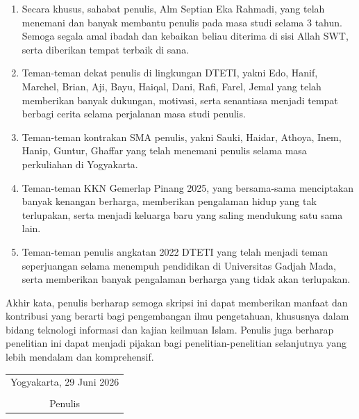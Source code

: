 \begin{enumerate}
	\item Secara khusus, sahabat penulis, Alm Septian Eka Rahmadi, yang telah menemani dan banyak membantu penulis pada masa studi selama 3 tahun. Semoga segala amal ibadah dan kebaikan beliau diterima di sisi Allah SWT, serta diberikan tempat terbaik di sana.

	\item Teman-teman dekat penulis di lingkungan DTETI, yakni Edo, Hanif, Marchel, Brian, Aji, Bayu, Haiqal, Dani, Rafi, Farel, Jemal yang telah memberikan banyak dukungan, motivasi, serta senantiasa menjadi tempat berbagi cerita selama perjalanan masa studi penulis.

	\item Teman-teman kontrakan SMA penulis, yakni Sauki, Haidar, Athoya, Inem, Hanip, Guntur, Ghaffar yang telah menemani penulis selama masa perkuliahan di Yogyakarta.
	
	\item Teman-teman KKN Gemerlap Pinang 2025, yang bersama-sama menciptakan banyak kenangan berharga, memberikan pengalaman hidup yang tak terlupakan, serta menjadi keluarga baru yang saling mendukung satu sama lain.
	
	\item Teman-teman penulis angkatan 2022 DTETI yang telah menjadi teman seperjuangan selama menempuh pendidikan di Universitas Gadjah Mada, serta memberikan banyak pengalaman berharga yang tidak akan terlupakan.


\end{enumerate}

Akhir kata, penulis berharap semoga skripsi ini dapat memberikan manfaat dan kontribusi yang berarti bagi pengembangan ilmu pengetahuan, khususnya dalam bidang teknologi informasi dan kajian keilmuan Islam. Penulis juga berharap penelitian ini dapat menjadi pijakan bagi penelitian-penelitian selanjutnya yang lebih mendalam dan komprehensif.

\begin{flushright}
	\begin{tabular}{c}
		Yogyakarta, 29 Juni 2026 \\
		\vspace{1cm} \\
		Penulis
	\end{tabular}
\end{flushright}